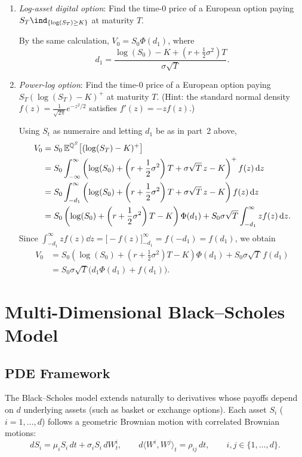\begin{example}
\begin{enumerate}
        \item \emph{Log-asset digital option}: Find the time-$0$ price of a European option paying $S_T \ind_{\{\log(S_T) \ge K\}}$ at maturity $T$.

        By the same calculation, $V_0 = S_0 \Phi(d_1)$, where
        \[
            d_1 = \frac{\log(S_0) - K + \left(r + \frac{1}{2}\sigma^2\right)T}{\sigma\sqrt{T}}.
        \]

        \item \emph{Power-log option}: Find the time-$0$ price of a European option paying $S_T(\log(S_T) - K)^+$ at maturity $T$. (Hint: the standard normal density $f(z) = \frac{1}{\sqrt{2\pi}}e^{-z^2/2}$ satisfies $f'(z) = -z f(z)$.)

        Using $S_t$ as numeraire and letting $d_1$ be as in part~2 above,
        \begin{align*}
            V_0 &= S_0\,\mathbb{E}^{\mathbb{Q}^S}\!\left[(\log(S_T) - K)^+\right] \\
            &= S_0 \int_{-\infty}^{\infty} \left(\log(S_0) + \left(r + \frac{1}{2}\sigma^2\right)T + \sigma\sqrt{T}\,z - K\right)^+ f(z)\,\mathrm{d} z \\
            &= S_0 \int_{-d_1}^{\infty} \left(\log(S_0) + \left(r + \frac{1}{2}\sigma^2\right)T + \sigma\sqrt{T}\,z - K\right) f(z)\,\mathrm{d} z \\
            &= S_0\left(\log(S_0) + \left(r + \frac{1}{2}\sigma^2\right)T - K\right)\Phi(d_1) + S_0\sigma\sqrt{T}\int_{-d_1}^{\infty} z f(z)\,\mathrm{d} z.
        \end{align*}
        Since $\int_{-d_1}^{\infty} z f(z)\dd z = \bigl[-f(z)\bigr]_{-d_1}^{\infty} = f(-d_1) = f(d_1)$, we obtain
        \begin{align*}
            V_0 &= S_0\left(\log(S_0) + \left(r + \frac{1}{2}\sigma^2\right)T - K\right)\Phi(d_1) + S_0\sigma\sqrt{T}\,f(d_1) \\
            &= S_0\sigma\sqrt{T}\bigl(d_1\Phi(d_1) + f(d_1)\bigr).
        \end{align*}
    \end{enumerate}
\end{example}

\section{Multi-Dimensional Black--Scholes Model}
\label{sec:ch04-multi-d}

\subsection{PDE Framework}
The Black--Scholes model extends naturally to derivatives whose payoffs depend on $d$ underlying assets (such as basket or exchange options). Each asset $S_i$ ($i = 1, \dots, d$) follows a geometric Brownian motion with correlated Brownian motions:
\[
    dS_i = \mu_i S_i\,dt + \sigma_i S_i\,dW_t^i, \qquad
    d\langle W^i, W^j \rangle_t = \rho_{ij}\,dt, \qquad i, j \in \{1, \dots, d\}.
\]

